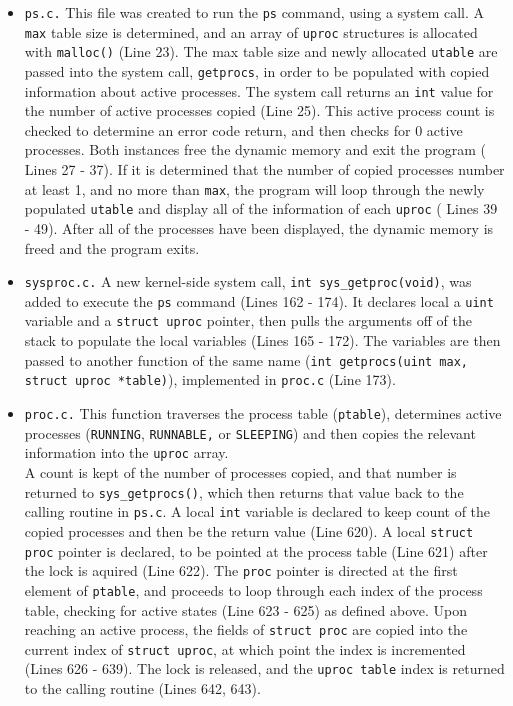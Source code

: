 \documentclass[11pt,letterpaper]{report}
\begin{document}
	\begin{itemize}
		
	\item {\tt ps.c.} This file was created to run the {\tt ps} command, using a system call. A {\tt max} table size is determined, and an array of {\tt uproc} structures is allocated with {\tt malloc()} ({\color{red}Line 23}). The max table size and newly allocated {\tt utable} are passed into the system call, {\tt getprocs}, in order to be populated with copied information about active processes. The system call returns an {\tt int} value for the number of active processes copied ({\color{red}Line 25}). This active process count is checked to determine an error code return, and then checks for 0 active processes. Both instances free the dynamic memory and exit the program ({\color{red} Lines 27 - 37}). If it is determined that the number of copied processes number at least 1, and no more than {\tt max}, the program will loop through the newly populated {\tt utable} and display all of the information of each {\tt uproc} ({\color{red} Lines 39 - 49}). After all of the processes have been displayed, the dynamic memory is freed and the program exits.
	
	\item {\tt sysproc.c.} A new kernel-side system call, {\tt int sys\_getproc(void)}, was added to execute the {\tt ps} command ({\color{red}Lines 162 - 174}). It declares local a {\tt uint} variable and a {\tt struct uproc} pointer, then pulls the arguments off of the stack to populate the local variables ({\color{red}Lines 165 - 172}). The variables are then passed to another function of the same name ({\tt int getprocs(uint max, struct uproc *table)}), implemented in {\tt proc.c} ({\color{red}Line 173}).
	
	\item {\tt proc.c.} This function traverses the process table ({\tt ptable}), determines active processes ({\tt RUNNING}, {\tt RUNNABLE,} or {\tt SLEEPING}) and then copies the relevant information into the {\tt uproc} array.\\
	 A count is kept of the number of processes copied, and that number is returned to {\tt sys\_getprocs()}, which then returns that value back to the calling routine in {\tt ps.c}. A local {\tt int} variable is declared to keep count of the copied processes and then be the return value ({\color{red}Line 620}). A local {\tt struct proc} pointer is declared, to be pointed at the process table ({\color{red}Line 621}) after the lock is aquired ({\color{red}Line 622}). The {\tt proc} pointer is directed at the first element of {\tt ptable}, and proceeds to loop through each index of the process table, checking for active states ({\color{red}Line 623 - 625}) as defined above. Upon reaching an active process, the fields of {\tt struct proc} are copied into the current index of {\tt struct uproc}, at which point the index is incremented ({\color{red}Lines 626 - 639}). The lock is released, and the {\tt uproc table} index is returned to the calling routine ({\color{red}Lines 642, 643}).
	 

\end{itemize}
\end{document}

